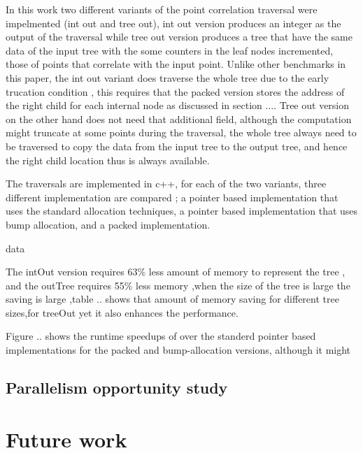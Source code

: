 \documentclass[preprint,10pt,nocopyrightspace,nonatbib]{./bibs/sigplanconf}
\begin{document}
In this work two different variants of the point correlation traversal were impelmented (int out and  tree out), int out version
produces an integer as the output of the traversal while  tree out version  produces a tree
that have the same data of the input tree with the some counters in the leaf nodes incremented, those of points that  
correlate with the input point. Unlike other benchmarks  in this paper, the int out variant does traverse the whole tree due to the early trucation condition ,
this requires that the packed version stores the address of the right child for each internal node as discussed in section .... Tree out version on the other hand 
does not need that additional field, although the computation might  truncate at some points during the traversal, 
the whole tree always need to be traversed to copy the data from the input tree to the output tree, 
and hence the right child location thus is always available.

The traversals are implemented in c++, for each of the two variants, three different implementation are compared ; 
a pointer based implementation that uses the standard allocation techniques, a pointer based implementation that uses bump allocation, 
and a packed implementation. 

data

The intOut version requires 63\% less amount of memory to represent the tree , and the outTree requires 55\% less memory ,when
the size of the tree is large the saving is large ,table .. shows that amount of memory saving for different tree sizes,for treeOut 
yet it also enhances the performance.

Figure .. shows the runtime speedups of over the standerd pointer based implementations for the packed and bump-allocation versions, 
although it might 

 
\subsection{Parallelism opportunity study}





\section{Future work}
\end{document}
